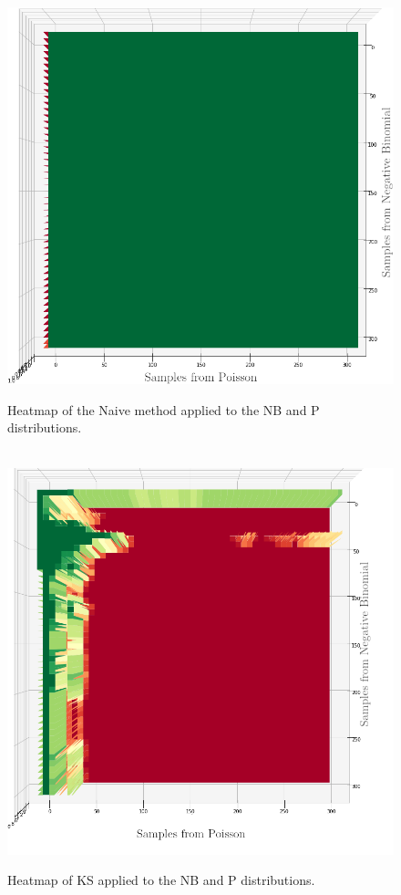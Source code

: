 \begin{figure}[h]
  \centering
  \includegraphics[width=\linewidth]{./img/hypothesis_test/deepar_X_poisson_Y_neg_bin_naive_edited.png}
  \caption{Heatmap of the Naive method applied to the NB and P distributions.}
  \label{naive_negative_bin_poisson}
  \endminipage
  \\
  \includegraphics[width=\linewidth]{./img/hypothesis_test/deepar_heatmap_Y_neg_bin_X_poisson_ks_edited_labels.png}
  \caption{Heatmap of KS applied to the NB and P distributions.}
  \label{ks_neg_bin_poisson}
  \endminipage
\end{figure}
\clearpage

